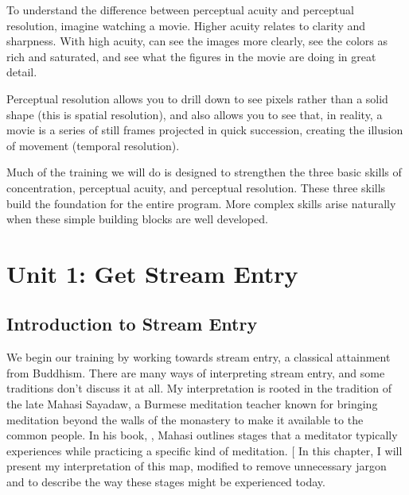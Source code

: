 \documentclass[a5paper,10pt,english]{book}
\begin{document}
\sphinxAtStartPar
To understand the difference between perceptual acuity and perceptual
resolution, imagine watching a movie. Higher acuity relates to clarity
and sharpness. With high acuity, can see the images more clearly, see
the colors as rich and saturated, and see what the figures in the movie
are doing in great detail.

\sphinxAtStartPar
Perceptual resolution allows you to drill down to see pixels rather than
a solid shape (this is spatial resolution), and also allows you to see
that, in reality, a movie is a series of still frames projected in quick
succession, creating the illusion of movement (temporal resolution).

\sphinxAtStartPar
Much of the training we will do is designed to strengthen the three
basic skills of concentration, perceptual acuity, and perceptual
resolution. These three skills build the foundation for the entire
program. More complex skills arise naturally when these simple building
blocks are well developed.


\section{Unit 1: Get Stream Entry}
\label{\detokenize{main-3:unit-1-get-stream-entry}}

\subsection{Introduction to Stream Entry}
\label{\detokenize{main-3:introduction-to-stream-entry}}
\sphinxAtStartPar
We begin our training by working towards stream entry, a classical
attainment from Buddhism. There are many ways of interpreting stream
entry, and some traditions don’t discuss it at all. My interpretation is
rooted in the tradition of the late Mahasi Sayadaw, a Burmese meditation
teacher known for bringing meditation beyond the walls of the monastery
to make it available to the common people. In his book, , Mahasi outlines stages that a meditator typically experiences
while practicing a specific kind of meditation. {[}\sphinxstyleemphasis{Mahasi was expanding
on the Visudimagga, a 5th century commentary by Buddaghosa. The
Visudimagga, in turn, was likely influenced by the Vimuttimagga, an
earlier text by Upatissa.}{]} In this chapter, I will present my
interpretation of this map, modified to remove unnecessary jargon and to
describe the way these stages might be experienced today.
\end{document}
